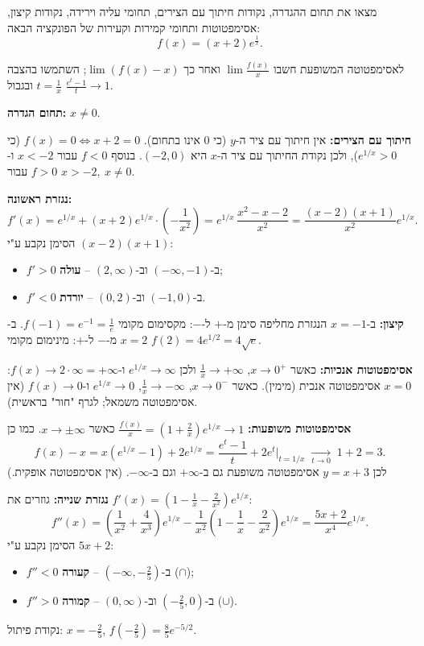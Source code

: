 
\begin{question}
מצאו את תחום ההגדרה, נקודות חיתוך עם הצירים, תחומי עליה וירידה, נקודות קיצון, אסימפטוטות ותחומי קמירות וקעירות של הפונקציה הבאה:
\[ f(x)=(x+2)e^{\frac1x}. \]
\end{question}

\begin{hint}
לאסימפטוטה המשופעת חשבו $\lim\frac{f(x)}{x}$ ואחר כך $\lim (f(x)-x)$; השתמשו בהצבה $t=\frac1x$ ובגבול $\frac{e^t-1}{t}\to1$.
\end{hint}

\begin{solution}
\textbf{תחום הגדרה:} $x\neq0$.

\textbf{חיתוך עם הצירים:} אין חיתוך עם ציר ה-$y$ (כי $0$ אינו בתחום). $f(x)=0\iff x+2=0$ (כי $e^{1/x}>0$), ולכן נקודת החיתוך עם ציר ה-$x$ היא $(-2,0)$. בנוסף $f<0$ עבור $x<-2$ ו-$f>0$ עבור $x>-2,\ x\ne0$.

\textbf{נגזרת ראשונה:}
\[ f'(x)=e^{1/x}+(x+2)e^{1/x}\cdot\left(-\frac1{x^2}\right)=e^{1/x}\,\frac{x^2-x-2}{x^2}=\frac{(x-2)(x+1)}{x^2}e^{1/x}. \]
הסימן נקבע ע"י $(x-2)(x+1)$:
\begin{itemize}
  \item $f'>0$ ב-$(-\infty,-1)$ וב-$(2,\infty)$ -- \textbf{עולה};
  \item $f'<0$ ב-$(-1,0)$ וב-$(0,2)$ -- \textbf{יורדת}.
\end{itemize}
\textbf{קיצון:} ב-$x=-1$ הנגזרת מחליפה סימן מ-$+$ ל-$-$: מקסימום מקומי $f(-1)=e^{-1}=\frac1e$. ב-$x=2$ מ-$-$ ל-$+$: מינימום מקומי $f(2)=4e^{1/2}=4\sqrt e$.

\textbf{אסימפטוטות אנכיות:} כאשר $x\to0^+$, $\frac1x\to+\infty$ ולכן $e^{1/x}\to\infty$ ו-$f(x)\to 2\cdot\infty=+\infty$: $x=0$ אסימפטוטה אנכית (מימין). כאשר $x\to0^-$, $\frac1x\to-\infty$, $e^{1/x}\to0$ ו-$f(x)\to 0$ (אין אסימפטוטה משמאל; לגרף "חור" בראשית).

\textbf{אסימפטוטות משופעות:} $\frac{f(x)}{x}=\left(1+\frac2x\right)e^{1/x}\to1$ כאשר $x\to\pm\infty$. כמו כן
\[ f(x)-x=x\left(e^{1/x}-1\right)+2e^{1/x}=\frac{e^{t}-1}{t}+2e^{t}\Big|_{t=1/x}\;\xrightarrow[t\to0]{}\;1+2=3. \]
לכן $y=x+3$ אסימפטוטה משופעת גם ב-$+\infty$ וגם ב-$-\infty$. (אין אסימפטוטה אופקית.)

\textbf{נגזרת שנייה:} גוזרים את $f'(x)=\left(1-\frac1x-\frac2{x^2}\right)e^{1/x}$:
\[ f''(x)=\left(\frac1{x^2}+\frac4{x^3}\right)e^{1/x}-\frac1{x^2}\left(1-\frac1x-\frac2{x^2}\right)e^{1/x}=\frac{5x+2}{x^4}e^{1/x}. \]
הסימן נקבע ע"י $5x+2$:
\begin{itemize}
  \item $f''<0$ ב-$(-\infty,-\frac25)$ -- \textbf{קעורה} ($\cap$);
  \item $f''>0$ ב-$(-\frac25,0)$ וב-$(0,\infty)$ -- \textbf{קמורה} ($\cup$).
\end{itemize}
נקודת פיתול: $x=-\frac25$, $f(-\frac25)=\frac85e^{-5/2}$.
\end{solution}
